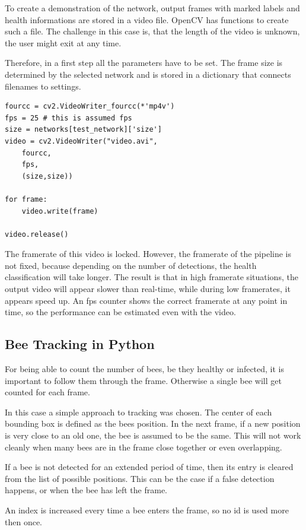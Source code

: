 \documentclass[a4paper,titlepage]{article}
\begin{document}
To create a demonstration of the network, output frames with marked labels and health informations are stored in a video file.
OpenCV has functions to create such a file.
The challenge in this case is, that the length of the video is unknown, the user might exit at any time.

Therefore, in a first step all the parameters have to be set.
The frame size is determined by the selected network and is stored in a dictionary that connects filenames to settings.

\begin{lstlisting}
fourcc = cv2.VideoWriter_fourcc(*'mp4v')
fps = 25 # this is assumed fps
size = networks[test_network]['size']
video = cv2.VideoWriter("video.avi",
    fourcc,
    fps,
    (size,size))

for frame:
    video.write(frame)

video.release()
\end{lstlisting}

The framerate of this video is locked.
However, the framerate of the pipeline is not fixed, because depending on the number of detections, the health classification will take longer.
The result is that in high framerate situations, the output video will appear slower than real-time, while during low framerates, it appears speed up.
An fps counter shows the correct framerate at any point in time, so the performance can be estimated even with the video.

\subsection{Bee Tracking in Python}

For being able to count the number of bees, be they healthy or infected, it is important to follow them through the frame.
Otherwise a single bee will get counted for each frame.

In this case a simple approach to tracking was chosen.
The center of each bounding box is defined as the bees position.
In the next frame, if a new position is very close to an old one, the bee is assumed to be the same.
This will not work cleanly when many bees are in the frame close together or even overlapping.

If a bee is not detected for an extended period of time, then its entry is cleared from the list of possible positions.
This can be the case if a false detection happens, or when the bee has left the frame.

An index is increased every time a bee enters the frame, so no id is used more then once.
\end{document}
